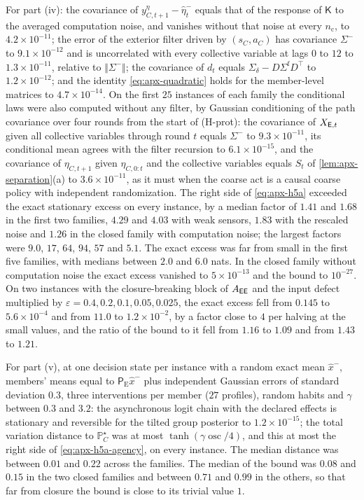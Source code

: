 \begin{numcheck}
For part (iv): the covariance of $y^\eta_{C,t+1}-\hat\eta^-_t$ equals that of the response of $\mathsf K$ to the averaged computation noise, and vanishes without that noise at every $n_{\mathrm c}$, to $4.2\times10^{-11}$; the error of the exterior filter driven by $(s_C,a_C)$ has covariance $\Sigma^-$ to $9.1\times10^{-12}$ and is uncorrelated with every collective variable at lags $0$ to $12$ to $1.3\times10^{-11}$, relative to $\Vert\Sigma^-\Vert$; the covariance of $d_t$ equals $\Sigma_\delta-D\Sigma^{\mathrm f}D^\top$ to $1.2\times10^{-12}$; and the identity \cref{eq:apx-quadratic} holds for the member-level matrices to $4.7\times10^{-14}$. On the first $25$ instances of each family the conditional laws were also computed without any filter, by Gaussian conditioning of the path covariance over four rounds from the start of (H-prot): the covariance of $X_{\mathsf{E},t}$ given all collective variables through round $t$ equals $\Sigma^-$ to $9.3\times10^{-11}$, its conditional mean agrees with the filter recursion to $6.1\times10^{-15}$, and the covariance of $\eta_{C,t+1}$ given $\eta_{C,0:t}$ and the collective variables equals $S_t$ of \cref{lem:apx-separation}(a) to $3.6\times10^{-11}$, as it must when the coarse act is a causal coarse policy with independent randomization. The right side of \cref{eq:apx-h5a} exceeded the exact stationary excess on every instance, by a median factor of $1.41$ and $1.68$ in the first two families, $4.29$ and $4.03$ with weak sensors, $1.83$ with the rescaled noise and $1.26$ in the closed family with computation noise; the largest factors were $9.0$, $17$, $64$, $94$, $57$ and $5.1$. The exact excess was far from small in the first five families, with medians between $2.0$ and $6.0$ nats. In the closed family without computation noise the exact excess vanished to $5\times10^{-13}$ and the bound to $10^{-27}$. On two instances with the closure-breaking block of $A_{\mathsf{E}\mathsf{E}}$ and the input defect multiplied by $\varepsilon=0.4,0.2,0.1,0.05,0.025$, the exact excess fell from $0.145$ to $5.6\times10^{-4}$ and from $11.0$ to $1.2\times10^{-2}$, by a factor close to $4$ per halving at the small values, and the ratio of the bound to it fell from $1.16$ to $1.09$ and from $1.43$ to $1.21$.

For part (v), at one decision state per instance with a random exact mean $\hat x^-$, members' means equal to $\mathsf P_{\mathrm E}\hat x^-$ plus independent Gaussian errors of standard deviation $0.3$, three interventions per member ($27$ profiles), random habits and $\gamma$ between $0.3$ and $3.2$: the asynchronous logit chain with the declared effects is stationary and reversible for the tilted group posterior to $1.2\times10^{-15}$; the total variation distance to $\mathbb P^\star_C$ was at most $\tanh(\gamma\operatorname{osc}/4)$, and this at most the right side of \cref{eq:apx-h5a-agency}, on every instance. The median distance was between $0.01$ and $0.22$ across the families. The median of the bound was $0.08$ and $0.15$ in the two closed families and between $0.71$ and $0.99$ in the others, so that far from closure the bound is close to its trivial value $1$.


\end{numcheck}
